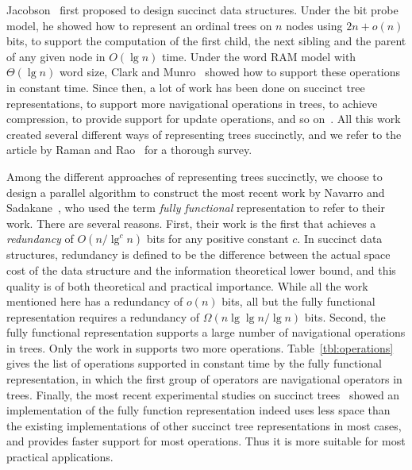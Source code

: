 Jacobson~\cite{j1989} first proposed to design succinct data structures. Under the bit probe model, he showed how to represent an ordinal trees on $n$ nodes using $2n+o(n)$ bits, to support the computation of the first child, the next sibling and the parent of any given node in $O(\lg n)$ time. 
Under the word RAM model with $\Theta(\lg n)$ word size, Clark and Munro~\cite{cm1996} showed how to support these operations in constant time. 
Since then, a lot of work has been done on succinct tree representations, to support more navigational operations in trees, to achieve compression, to provide support for update operations, and so on~\cite{mr1997,bdmr1999,grr2004,jss2007,ly2008,hms2012,fm2014,Navarro:2014:FFS:2620785.2601073}. 
All this work created several different ways of representing trees succinctly, and we refer to the article by Raman and Rao~\cite{rr2013} for a thorough survey.

Among the different approaches of representing trees succinctly, we choose to design a parallel algorithm to construct the most recent work by Navarro and Sadakane~\cite{Navarro:2014:FFS:2620785.2601073}, who used the term {\em fully functional} representation to refer to their work. There are several reasons. 
First, their work is the first that achieves a {\em redundancy} of $O(n/\lg^c n)$ bits for any positive constant $c$. 
In succinct data structures, redundancy is defined to be the difference between the actual space cost of the data structure and the information theoretical lower bound, and this quality is of both theoretical and practical importance. 
While all the work mentioned here has a redundancy of $o(n)$ bits, all but the fully functional representation requires a redundancy of $\Omega(n \lg\lg n / \lg n)$ bits. 
Second, the fully functional representation supports a large number of navigational operations in trees. Only the work in \cite{hms2012,fm2014} supports two more operations. 
Table~\ref{tbl:operations} gives the list of operations supported in constant time by the fully functional representation, in which the first group of operators are navigational operators in trees. 
Finally, the most recent experimental studies on succinct trees~\cite{ACNSalenex10} showed an implementation of the fully function representation indeed uses less space than the existing implementations of other succinct tree representations in most cases, and provides faster support for most operations. Thus it is more suitable for most practical applications. 

